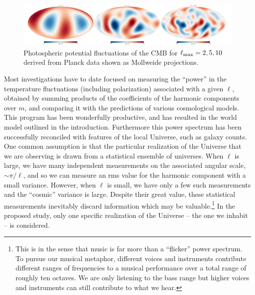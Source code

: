 \documentclass[psfig,12pt]{article}
\begin{document}
\begin{figure}[t]
\centering
\includegraphics[width=6.5in]{figures/Planck_lmaxs.pdf}
\caption{{\small Photospheric potential fluctuations of the CMB for
$\ell_{\rm max}=2,5,10$ derived from Planck data shown as Mollweide
projections.}}
\label{Fig:placklmaxs}
\end{figure}

Most investigations have to date focused on measuring the ``power'' in the
temperature fluctuations (including polarization) associated with a
given $\ell$, obtained by summing products of the coefficients of the
harmonic components over $m$, and comparing it with the predictions of
various cosmological models. This program has been wonderfully
productive, and has resulted in the world model outlined in the introduction.
Furthermore this power spectrum has been successfully reconciled with
features of the local Universe, such as galaxy counts. One common
assumption is that the particular realization of the Universe that we
are observing is drawn from a statistical ensemble of universes. When
$\ell$ is large, we have many independent measurements on the associated
angular scale, $\sim\pi/\ell$, and so we can measure an rms value for
the harmonic component with a small variance. However, when $\ell$ is
small, we have only a few such measurements and the ``cosmic'' variance
is large. Despite their great value, these statistical measurements
inevitably discard information which may be valuable.\footnote{This is
in the sense that music is far more than a ``flicker'' power spectrum.
To pursue our musical metaphor, different voices and instruments
contribute different ranges of frequencies to a musical performance over
a total range of roughly ten octaves. We are only listening to the bass
range but higher voices and instruments can still contribute to what we
hear.}  In the proposed study, only one specific realization of the
Universe -- the one we inhabit --  is considered.
\end{document}
